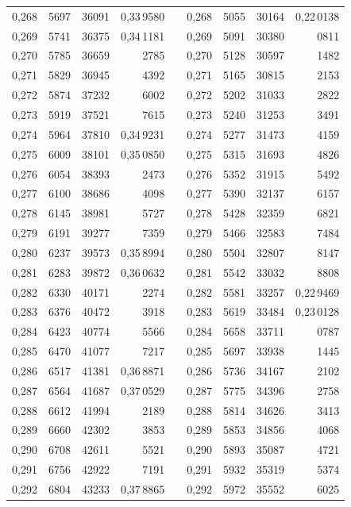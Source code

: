 \begin{tabular}{|c|c|c|r|@{}p{9pt}@{}|c|c|c|r|}
0,268 & 5697 & 36091 & 0,33\,9580 &  & 0,268 & 5055 & 30164 & 0,22\,0138 \\
0,269 & 5741 & 36375 & 0,34\,1181 &  & 0,269 & 5091 & 30380 & 0811 \\
0,270 & 5785 & 36659 & 2785 &  & 0,270 & 5128 & 30597 & 1482 \\[3pt]
0,271 & 5829 & 36945 & 4392 &  & 0,271 & 5165 & 30815 & 2153 \\
0,272 & 5874 & 37232 & 6002 &  & 0,272 & 5202 & 31033 & 2822 \\
0,273 & 5919 & 37521 & 7615 &  & 0,273 & 5240 & 31253 & 3491 \\
0,274 & 5964 & 37810 & 0,34\,9231 &  & 0,274 & 5277 & 31473 & 4159 \\
0,275 & 6009 & 38101 & 0,35\,0850 &  & 0,275 & 5315 & 31693 & 4826 \\[3pt]
0,276 & 6054 & 38393 & 2473 &  & 0,276 & 5352 & 31915 & 5492 \\
0,277 & 6100 & 38686 & 4098 &  & 0,277 & 5390 & 32137 & 6157 \\
0,278 & 6145 & 38981 & 5727 &  & 0,278 & 5428 & 32359 & 6821 \\
0,279 & 6191 & 39277 & 7359 &  & 0,279 & 5466 & 32583 & 7484 \\
0,280 & 6237 & 39573 & 0,35\,8994 &  & 0,280 & 5504 & 32807 & 8147 \\[3pt]
0,281 & 6283 & 39872 & 0,36\,0632 &  & 0,281 & 5542 & 33032 & 8808 \\
0,282 & 6330 & 40171 & 2274 &  & 0,282 & 5581 & 33257 & 0,22\,9469 \\
0,283 & 6376 & 40472 & 3918 &  & 0,283 & 5619 & 33484 & 0,23\,0128 \\
0,284 & 6423 & 40774 & 5566 &  & 0,284 & 5658 & 33711 & 0787 \\
0,285 & 6470 & 41077 & 7217 &  & 0,285 & 5697 & 33938 & 1445 \\[3pt]
0,286 & 6517 & 41381 & 0,36\,8871 &  & 0,286 & 5736 & 34167 & 2102 \\
0,287 & 6564 & 41687 & 0,37\,0529 &  & 0,287 & 5775 & 34396 & 2758 \\
0,288 & 6612 & 41994 & 2189 &  & 0,288 & 5814 & 34626 & 3413 \\
0,289 & 6660 & 42302 & 3853 &  & 0,289 & 5853 & 34856 & 4068 \\
0,290 & 6708 & 42611 & 5521 &  & 0,290 & 5893 & 35087 & 4721 \\[3pt]
0,291 & 6756 & 42922 & 7191 &  & 0,291 & 5932 & 35319 & 5374 \\
0,292 & 6804 & 43233 & 0,37\,8865 &  & 0,292 & 5972 & 35552 & 6025 \\

\end{tabular}
